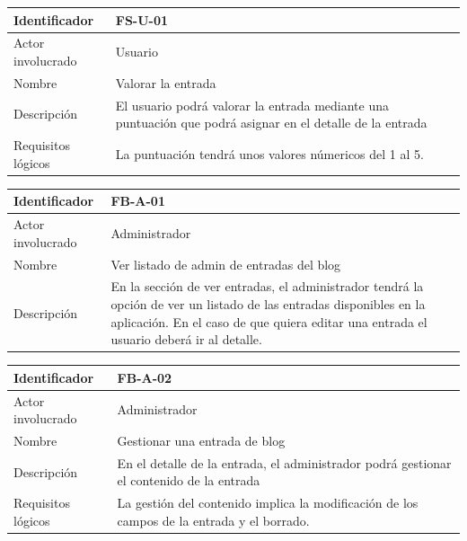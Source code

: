 \begin{table}[!htbp]
\centering
\begin{tabular}{|p{3cm}|p{10cm}|}
\hline
Identificador & FS-U-01 \\ \hline
Actor involucrado & Usuario \\ \hline
Nombre & Valorar la entrada\\ \hline
Descripción & El usuario podrá valorar la entrada mediante una puntuación que podrá asignar en el detalle de la entrada  \\ \hline
Requisitos lógicos & La puntuación tendrá unos valores númericos del 1 al 5.\\ \hline
\end{tabular}
\end{table}

\begin{table}[!htbp]
\centering
\begin{tabular}{|p{3cm}|p{10cm}|}
\hline
Identificador & FB-A-01 \\ \hline
Actor involucrado & Administrador \\ \hline
Nombre & Ver listado de admin de entradas del blog\\ \hline
Descripción & En la sección de ver entradas, el administrador tendrá la opción de ver un listado de las entradas disponibles en la aplicación. En el caso de que quiera editar una entrada el usuario deberá ir al detalle. \\ \hline

\end{tabular}
\end{table}

\begin{table}[!htbp]
\centering
\begin{tabular}{|p{3cm}|p{10cm}|}
\hline
Identificador & FB-A-02 \\ \hline
Actor involucrado & Administrador \\ \hline
Nombre & Gestionar una entrada de blog\\ \hline
Descripción & En el detalle de la entrada, el administrador podrá gestionar el contenido de la entrada  \\ \hline
Requisitos lógicos & La gestión del contenido implica la modificación de los campos de la entrada y el borrado. \\ \hline
\end{tabular}
\end{table}

